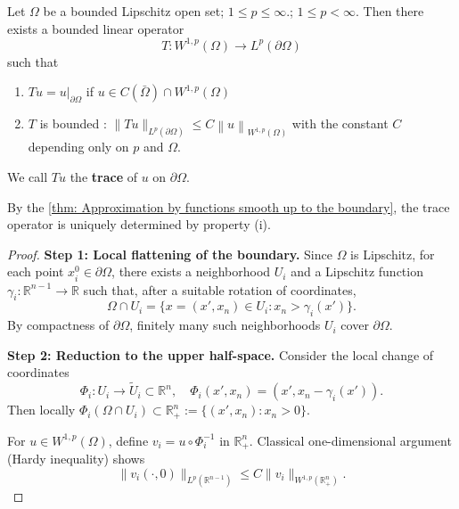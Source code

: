 \begin{theorem}
    Let $\Omega $ be a bounded Lipschitz open set; $1 \leq p \leq \infty$.; $1 \leq p <\infty$.
    Then there exists a bounded linear operator
    \begin{equation*}
        T : W^{1,p}\left(\Omega\right) \to L^p(\partial \Omega)
    \end{equation*}
    such that
    \begin{enumerate}[label=(\roman*)]
        \item
              \( Tu = u|_{\partial \Omega} \) if \( u \in C(\bar{\Omega})
              \cap
              W^{1,p}\left(\Omega\right) \)
        \item
              $T$ is bounded : \(\|Tu\|_{L^p(\partial \Omega)} \leq C\left\|u\right\|_{W^{1,p}\left(\Omega\right)}\) with the constant \( C \) depending only on \( p \) and \( \Omega \).
    \end{enumerate}
    We call \( Tu \) the \textbf{trace} of \( u \) on \( \partial \Omega \).
    \begin{remark}
        By the \cref{thm: Approximation by functions smooth up to the boundary}, the trace operator is uniquely determined by property (i).
    \end{remark}
    \begin{proof}
        \textbf{Step 1: Local flattening of the boundary.}
        Since $\Omega$ is Lipschitz, for each point $x_i^0 \in \partial \Omega$, there exists a neighborhood $U_i$ and a Lipschitz function $\gamma_i:\mathbb{R}^{n-1} \to \mathbb{R}$ such that, after a suitable rotation of coordinates,
        \[
            \Omega \cap U_i = \{ x = (x',x_n) \in U_i : x_n > \gamma_i(x') \}.
        \]
        By compactness of $\partial \Omega$, finitely many such neighborhoods $U_i$ cover $\partial \Omega$.

        \medskip

        \textbf{Step 2: Reduction to the upper half-space.}
        Consider the local change of coordinates
        \[
            \Phi_i: U_i \to \tilde{U}_i \subset \mathbb{R}^n, \quad
            \Phi_i(x',x_n) = (x', x_n - \gamma_i(x')).
        \]
        Then locally $\Phi_i(\Omega \cap U_i) \subset \mathbb{R}^n_+ := \{ (x',x_n) : x_n > 0 \}$.

        For $u \in W^{1,p}(\Omega)$, define $v_i = u \circ \Phi_i^{-1}$ in $\mathbb{R}^n_+$.
        Classical one-dimensional argument (Hardy inequality) shows
        \[
            \|v_i(\cdot,0)\|_{L^p(\mathbb{R}^{n-1})} \le C \|v_i\|_{W^{1,p}(\mathbb{R}^n_+)}.
        \]


\end{proof}
\end{theorem}
